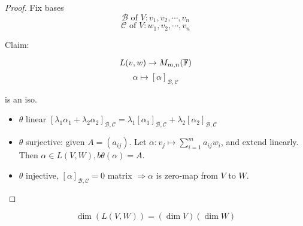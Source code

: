\documentclass[a4paper]{article}
\begin{document}
\begin{proof}
	Fix bases 
	\[ \mathcal{B} \text{ of } V: v_{1},v_{2},\cdots,v_{n}  \]
	\[ \mathcal{C} \text{ of } V: w_{1},v_{2},\cdots,v_{n}  \]
	
	Claim: 
	
	\[ L(v,w) \to M_{m,n}(\mathbb{F}) \]
	\[ \alpha \mapsto [\alpha]_{\mathcal{B},\mathcal{C}} \]
	
	is an iso. 
	
	\begin{itemize}
		\item $ \theta $ linear $ [\lambda_{1} \alpha_{1} + \lambda_{2}\alpha_{2}]_{\mathcal{B},\mathcal{C}} = \lambda_{1}[\alpha_{1}]_{\mathcal{B},\mathcal{C}} + \lambda_{2} [\alpha_{2}]_{\mathcal{B},\mathcal{C}}  $
		\item $ \theta $ surjective: given $ A = (a_{ij})$. Let $ \alpha : v_{j} \mapsto \sum_{i=1}^{m} a_{ij}w_{i} $, and extend linearly. Then $ \alpha \in L(V,W),b  \theta(\alpha) = A$.
		\item $ \theta $ injective, $ [\alpha]_{\mathcal{B},\mathcal{C}} = 0 $ matrix $ \Rightarrow \alpha $ is zero-map from $ V $ to $ W $.
	\end{itemize}
\end{proof}

\begin{cor} 
	\[ \dim(L(V,W)) = (\dim V)(\dim W) \]
\end{cor}
\end{document}

